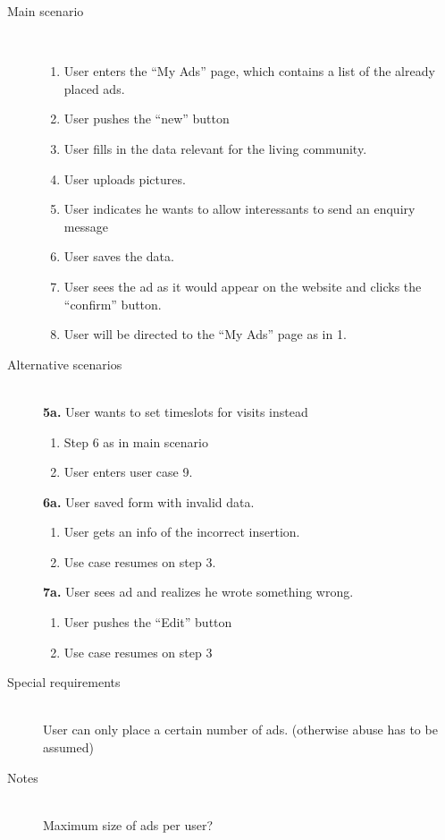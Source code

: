 \documentclass[a4wide]{article}
\begin{document}
\begin{description}
\item[Main scenario]\mbox{}\\
\begin{enumerate}
\item User enters the “My Ads” page, which contains a list of the already placed ads.
\item User pushes the “new” button
\item User fills in the data relevant for the living community.
\item User uploads pictures.
\item User indicates he wants to allow interessants to send an enquiry message
\item User saves the data.
\item User sees the ad as it would appear on the website and clicks the “confirm” button.
\item User will be directed to the “My Ads” page as in 1.
\end{enumerate}
\item[Alternative scenarios]\mbox{}\\
\textbf{5a.} User wants to set timeslots for visits instead
\begin{enumerate}
\item Step 6 as in main scenario
\item User enters user case 9.
\end{enumerate}
\textbf{6a.} User saved form with invalid data.
\begin{enumerate}
\item User gets an info of the incorrect insertion.
\item Use case resumes on step 3.
\end{enumerate}
\textbf{7a.} User sees ad and realizes he wrote something wrong.
\begin{enumerate}
\item User pushes the “Edit” button
\item Use case resumes on step 3
\end{enumerate}
\item[Special requirements]\mbox{}\\
User can only place a certain number of ads. (otherwise abuse has to be assumed)
\item[Notes]\mbox{}\\
Maximum size of ads per user?
\end{description}
\end{document}
